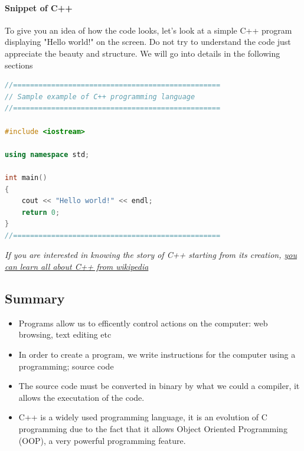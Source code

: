 \documentclass[11pt, a4paper]{article}
\begin{document}
\paragraph{Snippet of C++}
To give you an idea of how the code looks, let's look at a simple C++ program displaying "Hello world!"
on the screen. Do not try to understand the code just appreciate the beauty and structure. We will
go into details in the following sections

\begin{lstlisting}[caption=Sample example of C++ programming language, style=chstyle, language=C++]
//=================================================
// Sample example of C++ programming language
//=================================================

#include <iostream>

using namespace std;

int main()
{
    cout << "Hello world!" << endl;
    return 0;
}
//=================================================
\end{lstlisting}
\textit{ If you are interested in knowing the story of C++ starting from its creation,
\href{https://en.wikipedia.org/wiki/Bjarne_Stroustrup}{you can learn all about C++ from wikipedia}}

\subsection{Summary}
\begin{itemize}
    \item Programs allow us to efficently control actions on the computer: web browsing, text editing etc
    \item In order to create a program, we write instructions for the computer using a programming; source code
    \item The source code must be converted in binary by what we could a compiler, it allows the executation 
    of the code.
    \item  C++ is a widely used programming language, it is an evolution of C programming due to the fact that 
    it allows Object Oriented Programming (OOP), a very powerful programming feature.
\end{itemize}
\end{document}
